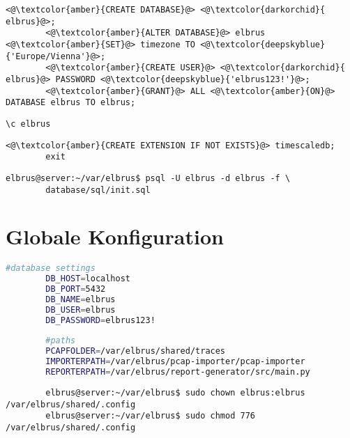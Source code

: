 \documentclass{article}
\begin{document}
	\lstset{style=files}
	\begin{lstlisting}[caption={Auführen von SQL Befehlen.}, numbers=none]
		<@\textcolor{amber}{CREATE DATABASE}@> <@\textcolor{darkorchid}{ elbrus}@>;
		<@\textcolor{amber}{ALTER DATABASE}@> elbrus <@\textcolor{amber}{SET}@> timezone TO <@\textcolor{deepskyblue}{'Europe/Vienna'}@>;
		<@\textcolor{amber}{CREATE USER}@> <@\textcolor{darkorchid}{ elbrus}@> PASSWORD <@\textcolor{deepskyblue}{'elbrus123!'}@>;
		<@\textcolor{amber}{GRANT}@> ALL <@\textcolor{amber}{ON}@> DATABASE elbrus TO elbrus;
	\end{lstlisting}
	
	\begin{lstlisting}[caption={Wechseln zu erstellter Datenbank.}, numbers=none]
		\c elbrus
	\end{lstlisting}

	\begin{lstlisting}[caption={Hinzufügen der TimescaleDB Erweiterung.}, numbers=none]
		<@\textcolor{amber}{CREATE EXTENSION IF NOT EXISTS}@> timescaledb;
		exit
	\end{lstlisting}

	\lstset{style=commands}
	\begin{lstlisting}[caption={Anlegen der benötigten Tabellen duch das ausführen von 'init.sql'.}]
		elbrus@server:~/var/elbrus$ psql -U elbrus -d elbrus -f \
		database/sql/init.sql
	\end{lstlisting}
	
	\newpage
	
	\section{Globale Konfiguration}
	\lstset{style=files}
	\begin{lstlisting}[caption={Anhand von '.config.example' eigene '.config' Datei in \newline'/var/elbrus/shared' anlegen.}, language=bash]
		#database settings
		DB_HOST=localhost
		DB_PORT=5432
		DB_NAME=elbrus
		DB_USER=elbrus
		DB_PASSWORD=elbrus123!
		
		#paths
		PCAPFOLDER=/var/elbrus/shared/traces
		IMPORTERPATH=/var/elbrus/pcap-importer/pcap-importer
		REPORTERPATH=/var/elbrus/report-generator/src/main.py
	\end{lstlisting}

	\lstset{style=commands}
	\begin{lstlisting}
		elbrus@server:~/var/elbrus$ sudo chown elbrus:elbrus /var/elbrus/shared/.config
		elbrus@server:~/var/elbrus$ sudo chmod 776 /var/elbrus/shared/.config
	\end{lstlisting}
	\newpage
	
\end{document}
